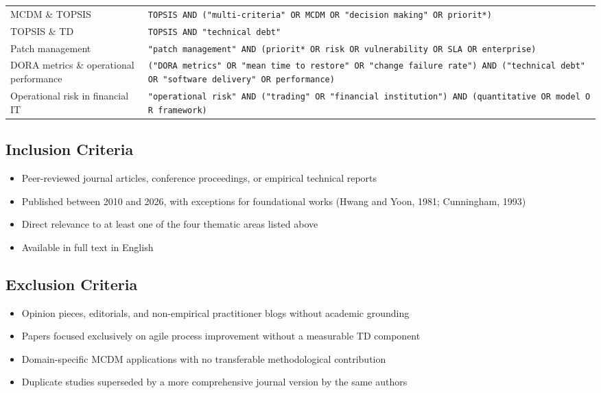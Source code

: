 \documentclass[
  11pt,
  letterpaper,
  11pt,
  oneside,
  english,
  onehalfspacing,
  headsepline]{MastersDoctoralThesis}
\providecommand{\tightlist}{%
  \setlength{\itemsep}{0pt}\setlength{\parskip}{0pt}}
\begin{document}
\begin{longtable}[]{@{}
  >{\raggedright\arraybackslash}p{}
  >{\raggedright\arraybackslash}p{}@{}}
MCDM \& TOPSIS &
\texttt{TOPSIS\ AND\ ("multi-criteria"\ OR\ MCDM\ OR\ "decision\ making"\ OR\ priorit*)} \\
TOPSIS \& TD & \texttt{TOPSIS\ AND\ "technical\ debt"} \\
Patch management &
\texttt{"patch\ management"\ AND\ (priorit*\ OR\ risk\ OR\ vulnerability\ OR\ SLA\ OR\ enterprise)} \\
DORA metrics \& operational performance &
\texttt{("DORA\ metrics"\ OR\ "mean\ time\ to\ restore"\ OR\ "change\ failure\ rate")\ AND\ ("technical\ debt"\ OR\ "software\ delivery"\ OR\ performance)} \\
Operational risk in financial IT &
\texttt{"operational\ risk"\ AND\ ("trading"\ OR\ "financial\ institution")\ AND\ (quantitative\ OR\ model\ OR\ framework)} \\
\end{longtable}

\subsection{Inclusion Criteria}\label{inclusion-criteria}

\begin{itemize}
\tightlist
\item
  Peer-reviewed journal articles, conference proceedings, or empirical
  technical reports
\item
  Published between 2010 and 2026, with exceptions for foundational
  works (Hwang and Yoon, 1981; Cunningham, 1993)
\item
  Direct relevance to at least one of the four thematic areas listed
  above
\item
  Available in full text in English
\end{itemize}

\subsection{Exclusion Criteria}\label{exclusion-criteria}

\begin{itemize}
\tightlist
\item
  Opinion pieces, editorials, and non-empirical practitioner blogs
  without academic grounding
\item
  Papers focused exclusively on agile process improvement without a
  measurable TD component
\item
  Domain-specific MCDM applications with no transferable methodological
  contribution
\item
  Duplicate studies superseded by a more comprehensive journal version
  by the same authors
\end{itemize}
\end{document}
